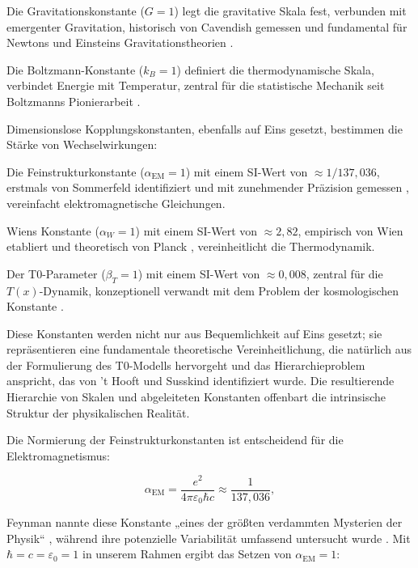 \documentclass[twocolumn,aps,prl]{revtex4-2}
\begin{document}
	Die Gravitationskonstante ($G = 1$) legt die gravitative Skala fest, verbunden mit emergenter Gravitation, historisch von Cavendish gemessen \cite{Cavendish1798} und fundamental für Newtons \cite{Newton1687} und Einsteins Gravitationstheorien \cite{Einstein1916}.
	
	Die Boltzmann-Konstante ($k_B = 1$) definiert die thermodynamische Skala, verbindet Energie mit Temperatur, zentral für die statistische Mechanik seit Boltzmanns Pionierarbeit \cite{Boltzmann1872}.
	
	Dimensionslose Kopplungskonstanten, ebenfalls auf Eins gesetzt, bestimmen die Stärke von Wechselwirkungen:
	
	Die Feinstrukturkonstante ($\alpha_{\text{EM}} = 1$) mit einem SI-Wert von $\approx 1/137,036$, erstmals von Sommerfeld identifiziert \cite{Sommerfeld1916} und mit zunehmender Präzision gemessen \cite{Aoyama2018}, vereinfacht elektromagnetische Gleichungen.
	
	Wiens Konstante ($\alpha_W = 1$) mit einem SI-Wert von $\approx 2,82$, empirisch von Wien etabliert \cite{Wien1896} und theoretisch von Planck \cite{Planck1901}, vereinheitlicht die Thermodynamik.
	
	Der T0-Parameter ($\beta_T = 1$) mit einem SI-Wert von $\approx 0,008$, zentral für die $T(x)$-Dynamik, konzeptionell verwandt mit dem Problem der kosmologischen Konstante \cite{Weinberg1989, Martin2012}.
	
	Diese Konstanten werden nicht nur aus Bequemlichkeit auf Eins gesetzt; sie repräsentieren eine fundamentale theoretische Vereinheitlichung, die natürlich aus der Formulierung des T0-Modells hervorgeht und das Hierarchieproblem anspricht, das von 't Hooft \cite{tHooft1980} und Susskind \cite{Susskind1979} identifiziert wurde. Die resultierende Hierarchie von Skalen und abgeleiteten Konstanten offenbart die intrinsische Struktur der physikalischen Realität.
	
	Die Normierung der Feinstrukturkonstanten ist entscheidend für die Elektromagnetismus:
	
	\begin{equation}
		\alpha_{\text{EM}} = \frac{e^2}{4 \pi \varepsilon_0 \hbar c} \approx \frac{1}{137,036}, \label{eq:fine_structure}
	\end{equation}
	
	Feynman nannte diese Konstante „eines der größten verdammten Mysterien der Physik“ \cite{Feynman1985}, während ihre potenzielle Variabilität umfassend untersucht wurde \cite{Webb2011, Rosenband2008}. Mit $\hbar = c = \varepsilon_0 = 1$ in unserem Rahmen ergibt das Setzen von $\alpha_{\text{EM}} = 1$:
	
\end{document}
